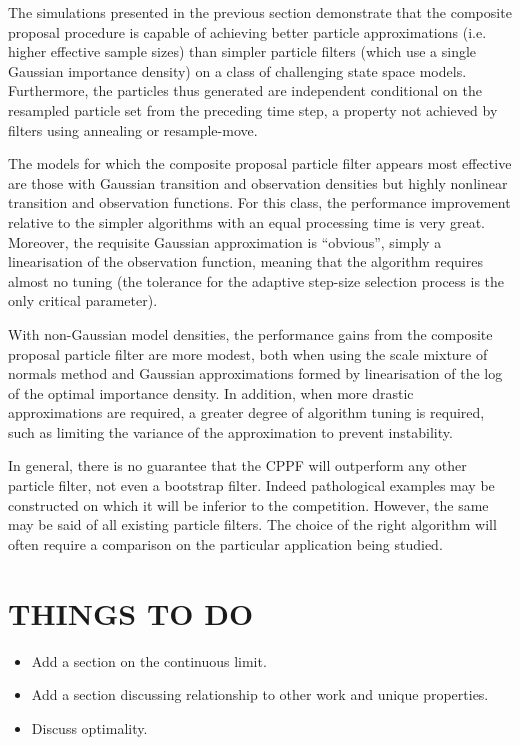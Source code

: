 \documentclass{article}
\begin{document}
The simulations presented in the previous section demonstrate that the composite proposal procedure is capable of achieving better particle approximations (i.e. higher effective sample sizes) than simpler particle filters (which use a single Gaussian importance density) on a class of challenging state space models. Furthermore, the particles thus generated are independent conditional on the resampled particle set from the preceding time step, a property not achieved by filters using annealing or resample-move.

The models for which the composite proposal particle filter appears most effective are those with Gaussian transition and observation densities but highly nonlinear transition and observation functions. For this class, the performance improvement relative to the simpler algorithms with an equal processing time is very great. Moreover, the requisite Gaussian approximation is ``obvious'', simply a linearisation of the observation function, meaning that the algorithm requires almost no tuning (the tolerance for the adaptive step-size selection process is the only critical parameter).

With non-Gaussian model densities, the performance gains from the composite proposal particle filter are more modest, both when using the scale mixture of normals method and Gaussian approximations formed by linearisation of the log of the optimal importance density. In addition, when more drastic approximations are required, a greater degree of algorithm tuning is required, such as limiting the variance of the approximation to prevent instability.

In general, there is no guarantee that the CPPF will outperform any other particle filter, not even a bootstrap filter. Indeed pathological examples may be constructed on which it will be inferior to the competition. However, the same may be said of all existing particle filters. The choice of the right algorithm will often require a comparison on the particular application being studied.



\section{THINGS TO DO}
\begin{itemize}
  \item Add a section on the continuous limit.
  \item Add a section discussing relationship to other work and unique properties.
  \item Discuss optimality.
\end{itemize}
\end{document}
